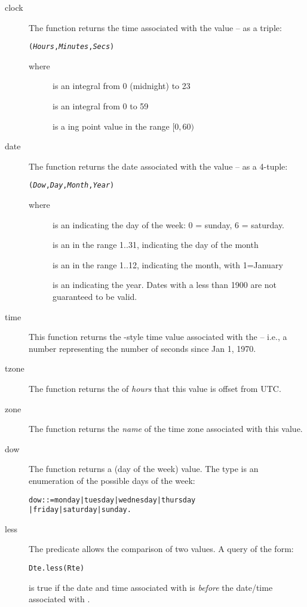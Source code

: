 \begin{description}
\item[clock]
The  function returns the time associated with the  value -- as a triple: 
\begin{alltt}
(\emph{Hours},\emph{Minutes},\emph{Secs})
\end{alltt}
where 
\begin{description}
\item[]
is an integral  from 0 (midnight) to 23
\item[]
is an integral  from 0 to 59
\item[]
is a ing point value in the range $[0,60)$
\end{description}
\item[date]
The  function returns the date associated with the  value -- as a 4-tuple:
\begin{alltt}
(\emph{Dow},\emph{Day},\emph{Month},\emph{Year})
\end{alltt}
where
\begin{description}
\item[]
is an  indicating the day of the week: 0 = sunday, 6 = saturday.
\item[]
is an  in the range 1..31, indicating the day of the month
\item[]
is an  in the range 1..12, indicating the month, with 1=January
\item[]
is an  indicating the year. Dates with a  less than 1900 are not guaranteed to be valid.
\end{description}
\item[time]
This function returns the -style time value associated with the  -- i.e., a number representing the number of seconds since Jan 1, 1970.
\item[tzone]
The  function returns the  of \emph{hours} that this  value is offset from UTC.
\item[zone]
The  function returns the \emph{name} of the time zone associated with this  value.
\item[dow]
The  function returns a  (day of the week) value. The  type is an enumeration of the possible days of the week:
\begin{alltt}
dow ::= monday | tuesday | wednesday | thursday
     | friday | saturday | sunday.
\end{alltt}
\item[less]
The  predicate allows the comparison of two  values. A query of the form:
\begin{alltt}
Dte.less(Rte)
\end{alltt}
is true if the date and time associated with  is \emph{before} the date/time associated with .
\end{description}

